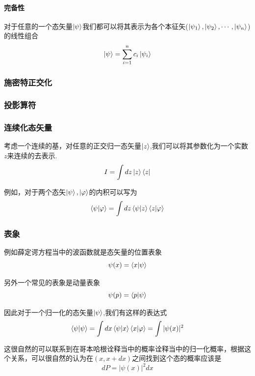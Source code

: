 \documentclass{article}
\begin{document}
\paragraph{完备性}对于任意的一个态矢量$\ket{\psi}$我们都可以将其表示为各个本征矢($\ket{\psi_1},\ket{\psi_2},\cdots,\ket{\psi_n}$)的线性组合
\[\ket{\psi}=\sum_{i=1}^nc_i\ket{\psi_i}\]

\subsubsection{施密特正交化}

\subsubsection{投影算符}

\subsubsection{连续化态矢量}
考虑一个连续的基，对任意的正交归一态矢量$\ket{z}$,我们可以将其参数化为一个实数$z$来连续的去表示.
\[I = \int dz \ket{z}\bra{z}\]

例如，对于两个态矢$\ket{\psi},\ket{\varphi}$的内积可以写为
\[\braket{\psi}{\varphi}=\int dz\braket{\psi}{z}\braket{z}{\varphi}\]

\subsubsection{表象}
例如薛定谔方程当中的波函数就是态矢量的位置表象
\[\psi(x)=\braket{x}{\psi}\]

另外一个常见的表象是动量表象
\[\psi(p)=\braket{p}{\psi}\]

因此对于一个归一化的态矢量$\ket{\psi}$,我们有这样的表达式
\[\braket{\psi}{\psi}=\int dx\braket{\psi}{x}\braket{x}{\varphi}=\int|\psi(x)|^2\]

这很自然的可以联系到在哥本哈根诠释当中的概率诠释当中的归一化概率，根据这个关系，可以很自然的认为在$(x,x+dx)$之间找到这个态的概率应该是
\[dP = |\psi(x)|^2dx\]
\end{document}
